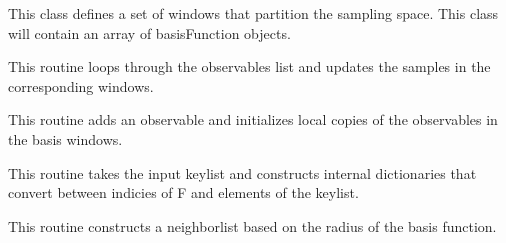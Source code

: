 \documentclass[letterpaper,10pt,english]{sphinxmanual}
\begin{document}
\begin{fulllineitems}
\label{applications/applications.doc:partition.partition}
This class defines a set of windows that partition the sampling space.
This class will contain an array of basisFunction objects.

\begin{fulllineitems}
\label{applications/applications.doc:partition.partition.accumulateObservables}
This routine loops through the observables list and updates the samples in the corresponding windows.

\end{fulllineitems}


\begin{fulllineitems}
\label{applications/applications.doc:partition.partition.addObservable}
This routine adds an observable and initializes local copies of the observables in the basis windows.

\end{fulllineitems}


\begin{fulllineitems}
\label{applications/applications.doc:partition.partition.build_keylist_to_index_map}
This routine takes the input keylist and constructs internal dictionaries that convert between indicies of F
and elements of the keylist.

\end{fulllineitems}


\begin{fulllineitems}
\label{applications/applications.doc:partition.partition.build_neighbor_list}
This routine constructs a neighborlist based on the radius of the basis 
function.


\end{fulllineitems}
\end{fulllineitems}
\end{document}
